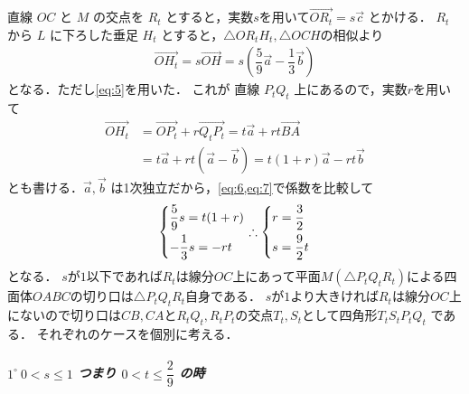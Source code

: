 \documentclass[../../main.tex]{subfiles}
\begin{document}
直線 $OC$ と $M$ の交点を $R_t$ とすると，実数$s$を用いて$\overrightarrow{OR_t} = s \vec{c}$ とかける．
$R_t$ から $L$ に下ろした垂足 $H_t$ とすると，$\triangle OR_tH_t, \triangle OCH$の相似より
\begin{align}
  \overrightarrow{OH_t} = s \overrightarrow{OH} = s\left( \dfrac{5}{9}\vec{a} - \dfrac{1}{3}\vec{b} \right) \label{eq:6}
\end{align}
となる．ただし\cref{eq:5}を用いた．
これが 直線 $P_t Q_t$ 上にあるので，実数$r$を用いて
\begin{align}
  \overrightarrow{OH_t}
  & = \overrightarrow{OP_t} + r \overrightarrow{Q_t P_t}
  = t \vec{a} + r t \overrightarrow{BA} \\
  & =t \vec{a} + r t (\vec{a} - \vec{b})
  = t(1+r) \vec{a} - rt \vec{b} \label{eq:7}
\end{align}
とも書ける．$\vec{a}, \vec{b}$ は1次独立だから，\cref{eq:6,eq:7}で係数を比較して
\begin{align}
  \begin{dcases}
    \dfrac{5}{9} s = t (1+r) \\
    -\dfrac{1}{3} s = -rt
  \end{dcases}
  \therefore
  \begin{dcases}
    r = \dfrac{3}{2} \\
    s = \dfrac{9}{2} t
  \end{dcases} \label{eq:8}
\end{align}
となる．
$s$が$1$以下であれば$R_t$は線分$OC$上にあって平面$M(\triangle P_tQ_tR_t)$による四面体$OABC$の切り口は$\triangle P_tQ_tR_t$自身である．
$s$が$1$より大きければ$R_t$は線分$OC$上にないので切り口は$CB,CA$と$R_tQ_t, R_tP_t$の交点$T_t,S_t$として四角形$T_tS_tP_tQ_t$ である．
それぞれのケースを個別に考える．

\subparagraph{$1^\circ \ 0 < s \le 1$ つまり $0 < t \le \dfrac{2}{9}$ の時}
\end{document}
